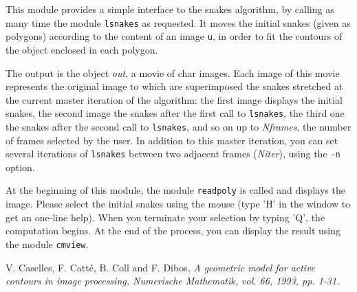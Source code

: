 This module provides a simple interface to the snakes algorithm, by calling
as many time the module \verb+lsnakes+ as requested.
It moves the initial snakes (given as polygons) according to the content of an
image \verb+u+, in order to fit the contours of the object enclosed in each polygon.

The output is the object {\em out}, a movie of char images.
Each image of this movie represents the original image to which are superimposed
the snakes stretched at the current master iteration of the algorithm:
the first image displays the initial snakes, the second image the snakes after
the first call to \verb+lsnakes+, the third one the snakes after the second call
to \verb+lsnakes+, and so on up to {\em Nframes}, the number of frames selected by the user.
In addition to this master iteration, you can set several iterations of
\verb+lsnakes+ between two adjacent frames ({\em Niter}), using the \verb+-n+ option.

At the beginning of this module, the module \verb+readpoly+ is called and
displays the image. Please select the initial snakes using the mouse (type 'H'
in the window to get an one-line help). 
When you terminate your selection by typing 'Q', the computation begins.
At the end of the process, you can display the result using the module
\verb+cmview+.

\begin{thebibliography}{1}
 V. Caselles, F. Catt\'e, B. Coll and F. Dibos, \em{A geometric model for active contours in image processing}, Numerische Mathematik, vol. 66, 1993, pp. 1-31.
\end{thebibliography}